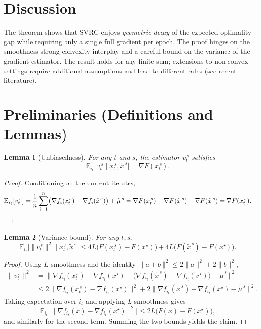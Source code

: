 \documentclass{article}
\newtheorem{lemma}{Lemma}[section]
\begin{document}
\section*{Discussion}
The theorem shows that SVRG enjoys \emph{geometric decay} of the expected optimality gap while requiring only a single full gradient per epoch. The proof hinges on the smoothness‑strong convexity interplay and a careful bound on the variance of the gradient estimator. The result holds for any finite sum; extensions to non‑convex settings require additional assumptions and lead to different rates (see recent literature).

\newpage
\section*{Preliminaries (Definitions and Lemmas)}
\begin{lemma}[Unbiasedness]\label{lem:unbiased}
For any $t$ and $s$, the estimator $v_t^{\,s}$ satisfies
\[
\mathbb{E}_{i_t}\!\bigl[\,v_t^{\,s}\mid x_{t}^{\,s},\tilde{x}^{\,s}\bigr]=\nabla F(x_{t}^{\,s}).
\]
\end{lemma}
\begin{proof}
Conditioning on the current iterates,
\[
\mathbb{E}_{i_t}[v_t^{\,s}]
= \frac{1}{n}\sum_{i=1}^{n}\bigl(\nabla f_i(x_{t}^{\,s})-\nabla f_i(\tilde{x}^{\,s})\bigr)+\tilde{\mu}^{\,s}
= \nabla F(x_{t}^{\,s})-\nabla F(\tilde{x}^{\,s})+\nabla F(\tilde{x}^{\,s})
= \nabla F(x_{t}^{\,s}).\qedhere
\]
\end{proof}

\begin{lemma}[Variance bound]\label{lem:varbound}
For any $t,s$,
\[
\mathbb{E}_{i_t}\!\bigl[\|v_t^{\,s}\|^{2}\mid x_{t}^{\,s},\tilde{x}^{\,s}\bigr]
\le 4L\bigl(F(x_{t}^{\,s})-F(x^\star)\bigr) + 4L\bigl(F(\tilde{x}^{\,s})-F(x^\star)\bigr).
\]
\end{lemma}
\begin{proof}
Using $L$‑smoothness and the identity $\|a+b\|^{2}\le2\|a\|^{2}+2\|b\|^{2}$,
\[
\begin{aligned}
\|v_t^{\,s}\|^{2}
&= \bigl\|\nabla f_{i_t}(x_{t}^{\,s})-\nabla f_{i_t}(x^\star)
      -\bigl(\nabla f_{i_t}(\tilde{x}^{\,s})-\nabla f_{i_t}(x^\star)\bigr)
      +\tilde{\mu}^{\,s}\bigr\|^{2}\\
&\le 2\bigl\|\nabla f_{i_t}(x_{t}^{\,s})-\nabla f_{i_t}(x^\star)\bigr\|^{2}
    +2\bigl\|\nabla f_{i_t}(\tilde{x}^{\,s})-\nabla f_{i_t}(x^\star)-\tilde{\mu}^{\,s}\bigr\|^{2}.
\end{aligned}
\]
Taking expectation over $i_t$ and applying $L$‑smoothness gives
\[
\mathbb{E}_{i_t}\!\bigl[\|\nabla f_{i_t}(x)-\nabla f_{i_t}(x^\star)\|^{2}\bigr]
\le 2L\bigl(F(x)-F(x^\star)\bigr),
\]
and similarly for the second term. Summing the two bounds yields the claim. \qedhere
\end{proof}
\end{document}
